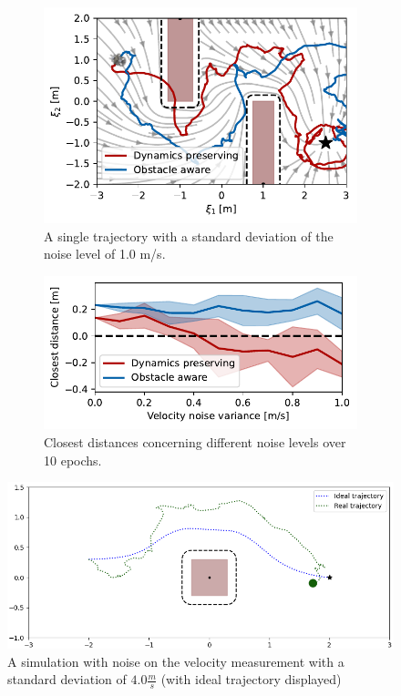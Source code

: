 \begin{figure}
    \centering
    \begin{subfigure}{\columnwidth}
      \centerline{\includegraphics[width=\textwidth]{figures/trajectory_velocity_noise}}
      \caption{A single trajectory with a standard deviation of the noise level of 1.0 m/s.}
      \label{fig:trajectory_velocity_noise}
    \end{subfigure}
    \begin{subfigure}{\columnwidth}
    \includegraphics[width=\textwidth]{figures/comparison_velocity_noise}
      \caption{Closest distances concerning different noise levels over 10 epochs.}
      \label{fig:comparison_velocity_noise}
    \end{subfigure}
    \caption{}
\label{fig:velocity_noise}
\end{figure}


\begin{figure}
\centerline{\includegraphics[width=\columnwidth]{figures/vel_noise_4.0.png}}
\caption{A simulation with noise on the velocity measurement with a standard deviation of $4.0 \frac{m}{s}$  (with ideal trajectory displayed)}
\label{fig_2_vel_noise}
\end{figure}


